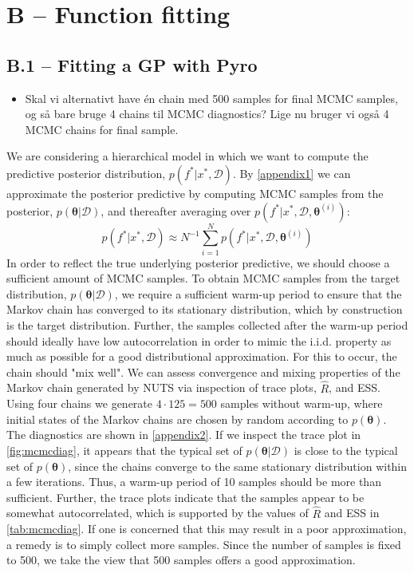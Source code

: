 \section*{B – Function fitting}

\subsection*{B.1 – Fitting a GP with Pyro}
\begin{itemize}
    \item Skal vi alternativt have én chain med 500 samples for final MCMC samples, og så bare bruge 4 chains til MCMC diagnostics? Lige nu bruger vi også 4 MCMC chains for final sample.
\end{itemize}
We are considering a hierarchical model in which we want to compute the predictive posterior distribution, $p(f^*|x^*,\mathcal{D})$. By \autoref{appendix1} we can approximate the posterior predictive by computing MCMC samples from the posterior, $p(\bm{\theta}|\mathcal{D})$, and thereafter averaging over $p(f^*|x^*,\mathcal{D},\bm{\theta}^{(i)})$:
\begin{equation}
    p(f^*|x^*,\mathcal{D})\approx N^{-1}\sum_{i=1}^Np(f^*|x^*,\mathcal{D},\bm{\theta}^{(i)})
\end{equation}
In order to reflect the true underlying posterior predictive, we should choose a sufficient amount of MCMC samples. To obtain MCMC samples from the target distribution, $p(\bm{\theta}|\mathcal{D})$, we require a sufficient warm-up period to ensure that the Markov chain has converged to its stationary distribution, which by construction is the target distribution. Further, the samples collected after the warm-up period should ideally have low autocorrelation in order to mimic the i.i.d. property as much as possible for a good distributional approximation. For this to occur, the chain should "mix well". We can assess convergence and mixing properties of the Markov chain generated by NUTS via inspection of trace plots, $\hat{R}$, and ESS. Using four chains we generate $4\cdot125=500$ samples without warm-up, where initial states of the Markov chains are chosen by random according to $p(\bm{\theta})$. The diagnostics are shown in \autoref{appendix2}. If we inspect the trace plot in \autoref{fig:mcmcdiag}, it appears that the typical set of $p(\bm{\theta}|\mathcal{D})$ is close to the typical set of $p(\bm{\theta})$, since the chains converge to the same stationary distribution within a few iterations. Thus, a warm-up period of 10 samples should be more than sufficient. Further, the trace plots indicate that the samples appear to be somewhat autocorrelated, which is supported by the values of $\hat{R}$ and ESS in \autoref{tab:mcmcdiag}. If one is concerned that this may result in a poor approximation, a remedy is to simply collect more samples. Since the number of samples is fixed to 500, we take the view that 500 samples offers a good approximation.

